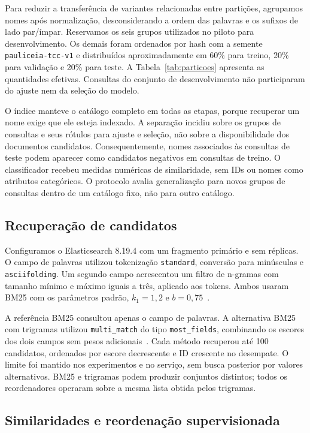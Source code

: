 Para reduzir a transferência de variantes relacionadas entre partições, agrupamos nomes após normalização, desconsiderando a ordem das palavras e os sufixos de lado par/ímpar. Reservamos os seis grupos utilizados no piloto para desenvolvimento. Os demais foram ordenados por hash com a semente \texttt{pauliceia-tcc-v1} e distribuídos aproximadamente em 60\% para treino, 20\% para validação e 20\% para teste. A Tabela~\ref{tab:particoes} apresenta as quantidades efetivas. Consultas do conjunto de desenvolvimento não participaram do ajuste nem da seleção do modelo.



O índice manteve o catálogo completo em todas as etapas, porque recuperar um nome exige que ele esteja indexado. A separação incidiu sobre os grupos de consultas e seus rótulos para ajuste e seleção, não sobre a disponibilidade dos documentos candidatos. Consequentemente, nomes associados às consultas de teste podem aparecer como candidatos negativos em consultas de treino. O classificador recebeu medidas numéricas de similaridade, sem IDs ou nomes como atributos categóricos. O protocolo avalia generalização para novos grupos de consultas dentro de um catálogo fixo, não para outro catálogo.

\subsection{Recuperação de candidatos}

Configuramos o Elasticsearch 8.19.4 com um fragmento primário e sem réplicas. O campo de palavras utilizou tokenização \texttt{standard}, conversão para minúsculas e \texttt{asciifolding}. Um segundo campo acrescentou um filtro de n-gramas com tamanho mínimo e máximo iguais a três, aplicado aos tokens. Ambos usaram BM25 com os parâmetros padrão, $k_1=1{,}2$ e $b=0{,}75$~\cite{elasticSimilarity}.

A referência BM25 consultou apenas o campo de palavras. A alternativa BM25 com trigramas utilizou \texttt{multi\_match} do tipo \texttt{most\_fields}, combinando os escores dos dois campos sem pesos adicionais~\cite{elasticMulti}. Cada método recuperou até 100 candidatos, ordenados por escore decrescente e ID crescente no desempate. O limite foi mantido nos experimentos e no serviço, sem busca posterior por valores alternativos. BM25 e trigramas podem produzir conjuntos distintos; todos os reordenadores operaram sobre a mesma lista obtida pelos trigramas.

\subsection{Similaridades e reordenação supervisionada}


